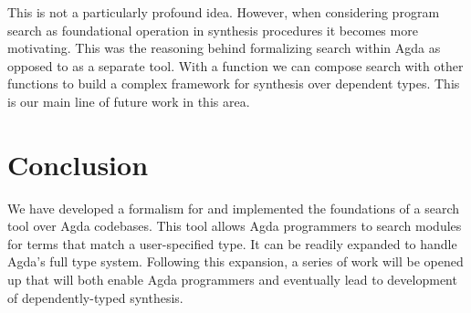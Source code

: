 \documentclass[acmsmall,review,authorversion]{acmart}
\newcommand{\?}{\stackrel{?}{\approx}}
\begin{document}
This is not a particularly profound idea. However, when considering program
search as foundational operation in synthesis procedures it becomes more
motivating. This was the reasoning behind formalizing search within Agda as
opposed to as a separate tool. With a function we can compose search with other
functions to build a complex framework for synthesis over dependent types. This
is our main line of future work in this area.


\section{Conclusion}

We have developed a formalism for and implemented the foundations of a search
tool over Agda codebases. This tool allows Agda programmers to search modules
for terms that match a user-specified type. It can be readily expanded to handle
Agda's full type system. Following this expansion, a series of work will be
opened up that will both enable Agda programmers and eventually lead to
development of dependently-typed synthesis.

\newpage



\end{document}
